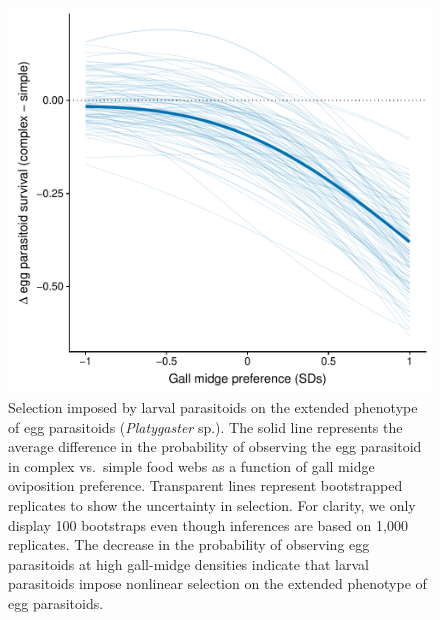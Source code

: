 \documentclass[11pt,]{article}
\begin{document}
\begin{figure}
\centering
\includegraphics{analyses/selection_on_Platygaster.pdf}
\caption{\label{fig:EggPtoid_Selection}Selection imposed by larval
parasitoids on the extended phenotype of egg parasitoids
(\emph{Platygaster} sp.). The solid line represents the average
difference in the probability of observing the egg parasitoid in complex
vs.~simple food webs as a function of gall midge oviposition preference.
Transparent lines represent bootstrapped replicates to show the
uncertainty in selection. For clarity, we only display 100 bootstraps
even though inferences are based on 1,000 replicates. The decrease in
the probability of observing egg parasitoids at high gall-midge
densities indicate that larval parasitoids impose nonlinear selection on
the extended phenotype of egg parasitoids.}
\end{figure}

\renewcommand\refname{Appendix}

\end{document}
